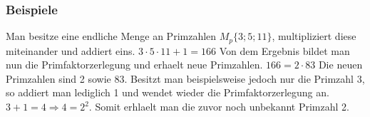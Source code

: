 \subsubsection{Beispiele}
Man besitze eine endliche Menge an Primzahlen $M_p\{3; 5; 11\}$, multipliziert diese miteinander und addiert eins.\newline
$3 \cdot 5 \cdot 11 + 1 = 166$\newline
Von dem Ergebnis bildet man nun die Primfaktorzerlegung und erhaelt neue Primzahlen.\newline
$166 = 2 \cdot 83$\newline
Die neuen Primzahlen sind 2 sowie 83.\newline
Besitzt man beispielsweise jedoch nur die Primzahl $3$, so addiert man lediglich 1 und wendet wieder die Primfaktorzerlegung an. $3 + 1 = 4 \Rightarrow 4 = 2^2$. Somit erhlaelt man die zuvor noch unbekannt Primzahl 2.
